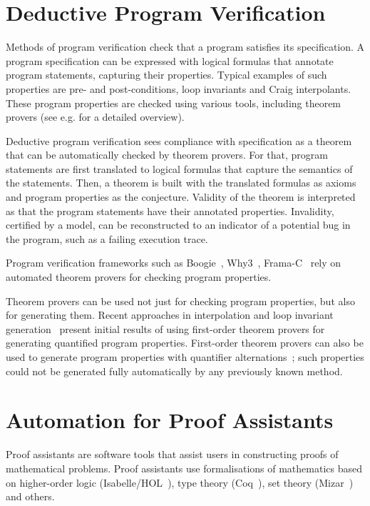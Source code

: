 \section*{Deductive Program Verification}
Methods of program verification check that a program satisfies its specification. A program specification can be expressed with logical formulas that annotate program statements, capturing their properties. Typical examples of such properties are pre- and post-conditions, loop invariants and Craig interpolants. These program properties are checked using various tools, including theorem provers (see e.g. \cite{Bonacina10} for a detailed overview).

Deductive program verification sees compliance with specification as a theorem that can be automatically checked by theorem provers. For that, program statements are first translated to logical formulas that capture the semantics of the statements. Then, a theorem is built with the translated formulas as axioms and program properties as the conjecture. Validity of the theorem is interpreted as that the program statements have their annotated properties. Invalidity, certified by a model, can be reconstructed to an indicator of a potential bug in the program, such as a failing execution trace.

Program verification frameworks such as Boogie~\cite{DBLP:conf/fmco/BarnettCDJL05}, Why3~\cite{DBLP:conf/esop/FilliatreP13}, Frama-C~\cite{FramaC} rely on automated theorem provers for checking program properties.

Theorem provers can be used not just for checking program properties, but also for generating them. Recent approaches in interpolation and loop invariant generation~\cite{McMillan08,fase2009,hoder2012popl} present initial results of using first-order theorem provers for generating quantified program properties. First-order theorem provers can also be used to generate program properties with quantifier alternations~\cite{fase2009}; such properties could not be generated fully automatically by any previously known method.

\section*{Automation for Proof Assistants}

Proof assistants are software tools that assist users in constructing proofs of mathematical problems. Proof assistants use formalisations of mathematics based on higher-order logic (Isabelle/HOL~\cite{Isabelle}), type theory (Coq~\cite{Coq}), set theory (Mizar~\cite{Mizar}) and others.

